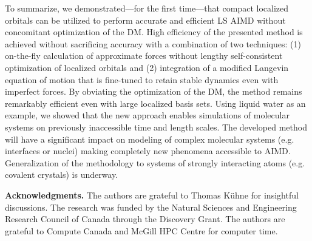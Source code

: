\documentclass[aps,prl,reprint,amsmath,amssymb]{revtex4-1}
\begin{document}
To summarize, we demonstrated---for the first time---that compact localized orbitals can be utilized to perform accurate and efficient LS AIMD without concomitant optimization of the DM. %
High efficiency of the presented method is achieved without sacrificing accuracy with a combination of two techniques: (1) on-the-fly calculation of approximate forces without lengthy self-consistent optimization of localized orbitals and (2) integration of a modified Langevin equation of motion that is fine-tuned to retain stable dynamics even with imperfect forces. 
By obviating the optimization of the DM, the method remains remarkably efficient even with large localized basis sets. 
Using liquid water as an example, we showed that the new approach enables simulations of molecular systems on previously inaccessible time and length scales. 
The developed method will have a significant impact on modeling of complex molecular systems (e.g. interfaces or nuclei) making completely new phenomena accessible to AIMD. 
Generalization of the methodology to systems of strongly interacting atoms (e.g. covalent crystals) is underway.

\textbf{Acknowledgments.} The authors are grateful to Thomas K\"uhne for insightful discussions. The research was funded by the Natural Sciences and Engineering Research Council of Canada through the Discovery Grant. The authors are grateful to Compute Canada and McGill HPC Centre for computer time.




\else

%
\end{document}
